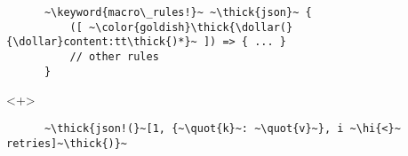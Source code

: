 \documentclass[usepdftitle=false]{beamer}
\newcommand{\dollar}{\makebox[\widthof{\$}][c]{\$}}
\newcommand{\thick}[1]{\contourlength{0.16pt}\contour[10]{black}{#1}}
\newcommand{\slantbox}[2][.5]
  {%
    \mbox
      {%
        \sbox{\foobox}{#2}%
        \hskip\wd\foobox
        \pdfsave
        \pdfsetmatrix{1 0 #1 1}%
        \llap{\usebox{\foobox}}%
        \pdfrestore
      }%
  }
\newcommand{\backslantbox}[2][.5]
  {%
    \mbox
      {%
        \sbox{\foobox}{#2}%
        \hskip\wd\foobox
        \pdfsave
        \pdfsetmatrix{-1 0 #1 1}%
        \llap{\usebox{\foobox}}%
        \pdfrestore
      }%
  }
\newcommand{\hi}[1]{%
\tikz[baseline=(A.base)]
 \node[highlighting=yellowbg,inner sep=0pt,text depth=0pt] (A) {#1};%
}
\newcommand{\openquote}{\backslantbox[.2]{\hspace{11pt}''\hspace{-11pt}}}
\newcommand{\closequote}{\slantbox[-.2]{\hspace{2pt}''\hspace{-2pt}}}
\newcommand{\blackquote}[1]{\openquote#1\closequote}
\newcommand{\quot}[1]{{\color{redish}\blackquote{#1}}}
\newcommand{\keyword}[1]{\color{greenish}#1}
\begin{document}
\begin{frame}[fragile]
\begin{onlyenv}
\begin{verbatim}
      ~\keyword{macro\_rules!}~ ~\thick{json}~ {
          ([ ~\color{goldish}\thick{\dollar(}{\dollar}content:tt\thick{)*}~ ]) => { ... }
          // other rules
      }
    \end{verbatim}
  \end{onlyenv}
  \begin{onlyenv}<+>
    \vspace{-20.5pt}
    \begin{verbatim}
      ~\thick{json!(}~[1, {~\quot{k}~: ~\quot{v}~}, i ~\hi{<}~ retries]~\thick{)}~


\end{verbatim}
\end{onlyenv}
\end{frame}
\end{document}
